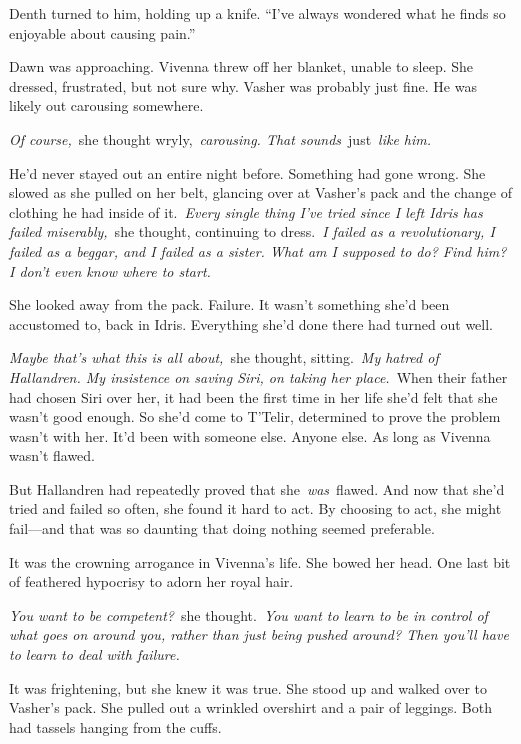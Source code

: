 Denth turned to him, holding up a knife. “I’ve always wondered what he finds so enjoyable about causing pain.”

\orn

Dawn was approaching. Vivenna threw off her blanket, unable to sleep. She dressed, frustrated, but not sure why. Vasher was probably just fine. He was likely out carousing somewhere.

\textit{Of course,}~she thought wryly,~\textit{carousing. That sounds}~just~\textit{like him.}

He’d never stayed out an entire night before. Something had gone wrong. She slowed as she pulled on her belt, glancing over at Vasher’s pack and the change of clothing he had inside of it.~\textit{Every single thing I’ve tried since I left Idris has failed miserably,}~she thought, continuing to dress.~\textit{I failed as a revolutionary, I failed as a beggar, and I failed as a sister. What am I supposed to do? Find him? I don’t even know where to start.}

She looked away from the pack. Failure. It wasn’t something she’d been accustomed to, back in Idris. Everything she’d done there had turned out well.

\textit{Maybe that’s what this is all about,}~she thought, sitting.~\textit{My hatred of Hallandren. My insistence on saving Siri, on taking her place.}~When their father had chosen Siri over her, it had been the first time in her life she’d felt that she wasn’t good enough. So she’d come to T’Telir, determined to prove the problem wasn’t with her. It’d been with someone else. Anyone else. As long as Vivenna wasn’t flawed.

But Hallandren had repeatedly proved that she~\textit{was}~flawed. And now that she’d tried and failed so often, she found it hard to act. By choosing to act, she might fail—and that was so daunting that doing nothing seemed preferable.

It was the crowning arrogance in Vivenna’s life. She bowed her head. One last bit of feathered hypocrisy to adorn her royal hair.

\textit{You want to be competent?}~she thought.~\textit{You want to learn to be in control of what goes on around you, rather than just being pushed around? Then you’ll have to learn to deal with failure.}

It was frightening, but she knew it was true. She stood up and walked over to Vasher’s pack. She pulled out a wrinkled overshirt and a pair of leggings. Both had tassels hanging from the cuffs.


